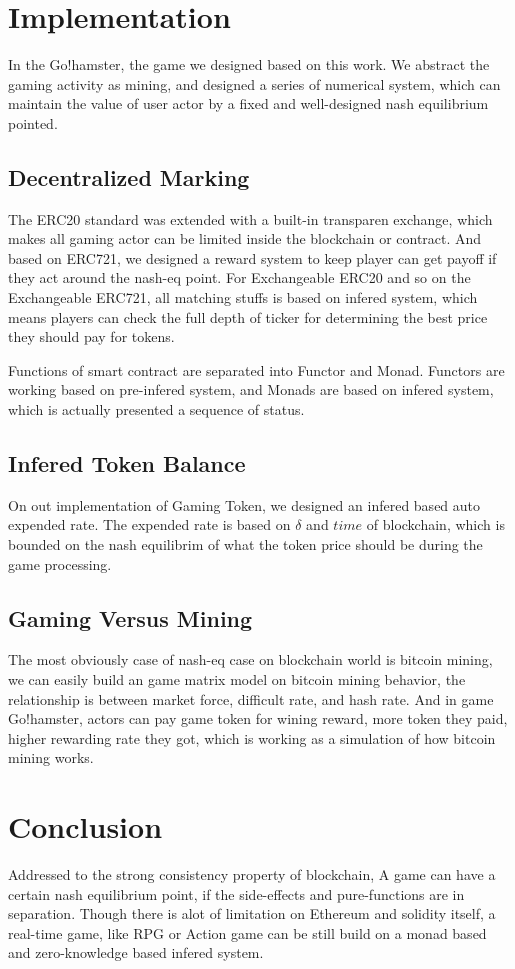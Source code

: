 \documentclass[twocolumn]{article}
\begin{document}
\section {Implementation}

In the Go!hamster, the game we designed based on this work. We abstract the gaming activity as mining, and designed a series of numerical system, which can maintain the value of user actor by a fixed and well-designed nash equilibrium pointed. 
\subsection {Decentralized Marking}

The ERC20 standard was extended with a built-in transparen exchange, which makes all gaming actor can be limited inside the blockchain or contract. And based on ERC721, we designed a reward system to keep player can get payoff if they act around the nash-eq point. For Exchangeable ERC20 and so on the Exchangeable ERC721, all matching stuffs is based on infered system, which means players can check the full depth of ticker for determining the best price they should pay for tokens.

Functions of smart contract are separated into Functor and Monad. Functors are working based on pre-infered system, and Monads are based on infered system, which is actually presented a sequence of status.

\subsection {Infered Token Balance}

On out implementation of Gaming Token, we designed an infered based auto expended rate. The expended rate is based on $\delta$ and $time$ of blockchain, which is bounded on the nash equilibrim of what the token price should be during the game processing.

\subsection {Gaming Versus Mining}

The most obviously case of nash-eq case on blockchain world is bitcoin mining\cite{bitcoin}, we can easily build an game matrix model on bitcoin mining behavior, the relationship is between market force, difficult rate, and hash rate. And in game Go!hamster, actors can pay game token for wining reward, more token they paid, higher rewarding rate they got, which is working as a simulation of how bitcoin mining works.

\section {Conclusion}

Addressed to the strong consistency property of blockchain, A game can have a certain nash equilibrium point, if the side-effects and pure-functions are in separation. Though there is alot of limitation on Ethereum and solidity itself, a real-time game, like RPG or Action game can be still build on a monad based and zero-knowledge based infered system.



\end{document}
